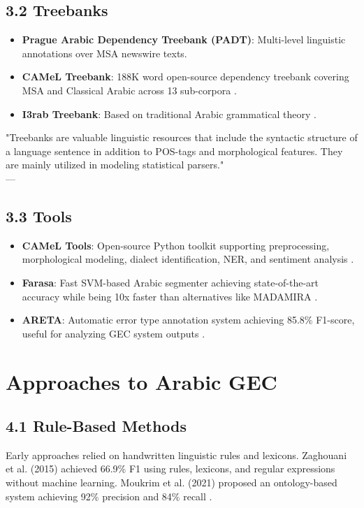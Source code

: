 \documentclass{article}
\begin{document}
\subsection*{3.2 Treebanks}
\begin{itemize}
    \item \textbf{Prague Arabic Dependency Treebank (PADT)}: Multi-level linguistic annotations over MSA newswire texts.
    \item \textbf{CAMeL Treebank}: 188K word open-source dependency treebank covering MSA and Classical Arabic across 13 sub-corpora \cite{habash2022camel}.
    \item \textbf{I3rab Treebank}: Based on traditional Arabic grammatical theory \cite{halabi2020i3rab}.
\end{itemize}

\begin{tcolorbox}[quotebox]
"Treebanks are valuable linguistic resources that include the syntactic structure of a language sentence in addition to POS-tags and morphological features. They are mainly utilized in modeling statistical parsers." \\
\raggedleft — \cite{halabi2020i3rab}
\end{tcolorbox}

\subsection*{3.3 Tools}
\begin{itemize}
    \item \textbf{CAMeL Tools}: Open-source Python toolkit supporting preprocessing, morphological modeling, dialect identification, NER, and sentiment analysis \cite{obeid2020camel}.
    \item \textbf{Farasa}: Fast SVM-based Arabic segmenter achieving state-of-the-art accuracy while being 10x faster than alternatives like MADAMIRA \cite{abdelali2016farasa}.
    \item \textbf{ARETA}: Automatic error type annotation system achieving 85.8\% F1-score, useful for analyzing GEC system outputs \cite{belkebir2021areta}.
\end{itemize}

\section{\textcolor{accentred}{Approaches to Arabic GEC}}

\subsection*{4.1 Rule-Based Methods}
Early approaches relied on handwritten linguistic rules and lexicons. Zaghouani et al. (2015) achieved 66.9\% F1 using rules, lexicons, and regular expressions without machine learning. Moukrim et al. (2021) proposed an ontology-based system achieving 92\% precision and 84\% recall \cite{moukrim2021ontology}.
\end{document}
